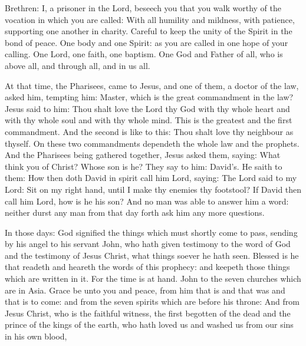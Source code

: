 \begin{multicols}{2}

Brethren: I, a prisoner in the Lord, beseech you that you walk
worthy of the vocation in which you are called:
With all humility and mildness, with patience, supporting one
another in charity.
Careful to keep the unity of the Spirit in the bond of peace.
One body and one Spirit: as you are called in one hope of your
calling.
One Lord, one faith, one baptism.
One God and Father of all, who is above all, and through all, and
in us all.



At that time, the Pharisees, %
came to Jesus, %
and one of them, a doctor of the law, asked him, tempting him:
Master, which is the great commandment in the law?
Jesus said to him: Thou shalt love the Lord thy God with thy
whole heart and with thy whole soul and with thy whole mind.
This is the greatest and the first commandment.
And the second is like to this: Thou shalt love thy neighbour as
thyself.
On these two commandments dependeth the whole law and the
prophets.
And the Pharisees being gathered together, Jesus asked them,
saying: What think you of Christ? Whose son is he? They say to
him: David's.
He saith to them: How then doth David in spirit call him Lord,
saying:
The Lord said to my Lord: Sit on my right hand, until I make thy
enemies thy footstool?
If David then call him Lord, how is he his son?
And no man was able to answer him a word: neither durst any man
from that day forth ask him any more questions.


\bigskip





In those days: God signified the things which must shortly come to pass,
sending by his angel to his servant John,
who hath given testimony to the word of God and the testimony of
Jesus Christ, what things soever he hath seen.
Blessed is he that readeth and heareth the words of this prophecy:
and keepeth those things which are written in it. For the time is at
hand.
John to the seven churches which are in Asia. Grace be unto you and
peace, from him that is and that was and that is to come: and from the
seven spirits which are before his throne:
And from Jesus Christ, who is the faithful witness, the first
begotten of the dead and the prince of the kings of the earth, who hath
loved us and washed us from our sins in his own blood,



\end{multicols}
